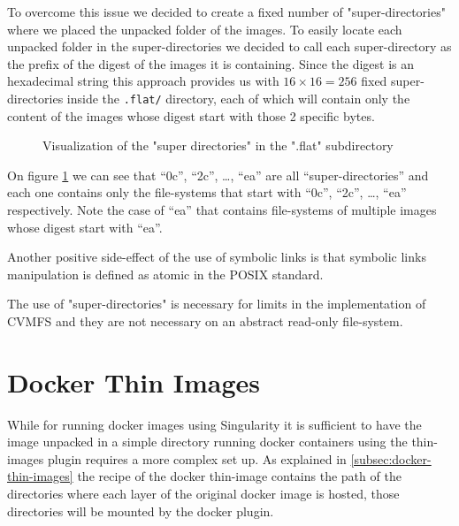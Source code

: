 To overcome this issue we decided to create a fixed number of
"super-directories" where we placed the unpacked folder of the images.  To
easily locate each unpacked folder in the super-directories we decided to call
each super-directory as the prefix of the digest of the images it is
containing. Since the digest is an hexadecimal string this approach provides us
with $16 \times 16 = 256$ fixed super-directories inside the \texttt{.flat/}
directory, each of which will contain only the content of the images whose
digest start with those 2 specific bytes.

\begin{figure}
\caption{Visualization of the "super directories" in the ".flat" subdirectory}
\label{fig:super-directories}
\end{figure}

On figure \ref{fig:super-directories} we can see that “0c”, “2c”, …, “ea” are
all “super-directories” and each one contains only the file-systems that start
with “0c”, “2c”, …, “ea” respectively.  Note the case of “ea” that contains
file-systems of multiple images whose digest start with “ea”.

Another positive side-effect of the use of symbolic links is that symbolic
links manipulation is defined as atomic in the POSIX standard.

The use of "super-directories" is necessary for limits in the implementation of
CVMFS and they are not necessary on an abstract read-only file-system.

\section{Docker Thin Images}

While for running docker images using Singularity it is sufficient to have the
image unpacked in a simple directory running docker containers using the
thin-images plugin requires a more complex set up.  As explained in
\ref{subsec:docker-thin-images} the recipe of the docker thin-image contains
the path of the directories where each layer of the original docker image is
hosted, those directories will be mounted by the docker plugin.

